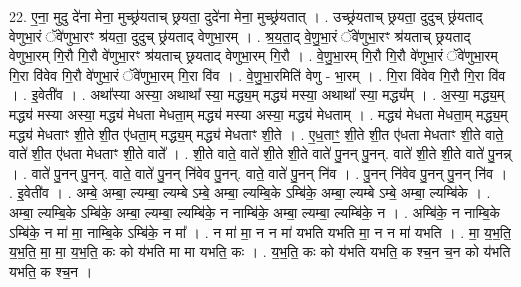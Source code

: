 \documentclass[17pt]{extarticle}
\begin{document}
22. ए॒ना॒ मुदु दे॑ना मेना॒ मुच्छ्र॑यताच् छ्रयता॒ दुदे॑ना मेना॒ मुच्छ्र॑यतात् । . उच्छ्र॑यताच् छ्रयता॒ दुदुच् छ्र॑यताद् वेणुभा॒रं ॅवे॑णुभा॒रꣳ श्र॑यता॒ दुदुच् छ्र॑यताद् वेणुभा॒रम् । . श्र॒य॒ता॒द् वे॒णु॒भा॒रं ॅवे॑णुभा॒रꣳ श्र॑यताच् छ्रयताद् वेणुभा॒रम् गि॒रौ गि॒रौ वे॑णुभा॒रꣳ श्र॑यताच् छ्रयताद् वेणुभा॒रम् गि॒रौ । . वे॒णु॒भा॒रम् गि॒रौ गि॒रौ वे॑णुभा॒रं ॅवे॑णुभा॒रम् गि॒रा वि॑वेव गि॒रौ वे॑णुभा॒रं ॅवे॑णुभा॒रम् गि॒रा वि॑व । . वे॒णु॒भा॒रमिति॑ वेणु - भा॒रम् । . गि॒रा वि॑वेव गि॒रौ गि॒रा वि॑व । . इ॒वेती॑व । . अथा᳚स्या अस्या॒ अथाथा᳚ स्या॒ मद्ध्य॒म् मद्ध्य॑ मस्या॒ अथाथा᳚ स्या॒ मद्ध्य᳚म् । . अ॒स्या॒ मद्ध्य॒म् मद्ध्य॑ मस्या अस्या॒ मद्ध्य॑ मेधता मेधता॒म् मद्ध्य॑ मस्या अस्या॒ मद्ध्य॑ मेधताम् । . मद्ध्य॑ मेधता मेधता॒म् मद्ध्य॒म् मद्ध्य॑ मेधताꣳ शी॒ते शी॒त ए॑धता॒म् मद्ध्य॒म् मद्ध्य॑ मेधताꣳ शी॒ते । . ए॒ध॒ताꣳ॒॒ शी॒ते शी॒त ए॑धता मेधताꣳ शी॒ते वाते॒ वाते॑ शी॒त ए॑धता मेधताꣳ शी॒ते वाते᳚ । . शी॒ते वाते॒ वाते॑ शी॒ते शी॒ते वाते॑ पु॒नन् पु॒नन्. वाते॑ शी॒ते शी॒ते वाते॑ पु॒नन्न् । . वाते॑ पु॒नन् पु॒नन्. वाते॒ वाते॑ पु॒नन् नि॑वेव पु॒नन्. वाते॒ वाते॑ पु॒नन् नि॑व । . पु॒नन् नि॑वेव पु॒नन् पु॒नन् नि॑व । . इ॒वेती॑व । . अम्बे॒ अम्बा॒ ल्यम्बा॒ ल्यम्बे ऽम्बे॒ अम्बा॒ ल्यम्बि॒के ऽम्बि॑के॒ अम्बा॒ ल्यम्बे ऽम्बे॒ अम्बा॒ ल्यम्बि॑के । . अम्बा॒ ल्यम्बि॒के ऽम्बि॑के॒ अम्बा॒ ल्यम्बा॒ ल्यम्बि॑के॒ न नाम्बि॑के॒ अम्बा॒ ल्यम्बा॒ ल्यम्बि॑के॒ न । . अम्बि॑के॒ न नाम्बि॒के ऽम्बि॑के॒ न मा॑ मा॒ नाम्बि॒के ऽम्बि॑के॒ न मा᳚ । . न मा॑ मा॒ न न मा॑ यभति यभति मा॒ न न मा॑ यभति । . मा॒ य॒भ॒ति॒ य॒भ॒ति॒ मा॒ मा॒ य॒भ॒ति॒ कः को य॑भति मा मा यभति॒ कः । . य॒भ॒ति॒ कः को य॑भति यभति॒ क श्च॒न च॒न को य॑भति यभति॒ क श्च॒न । \newline
\end{document}
